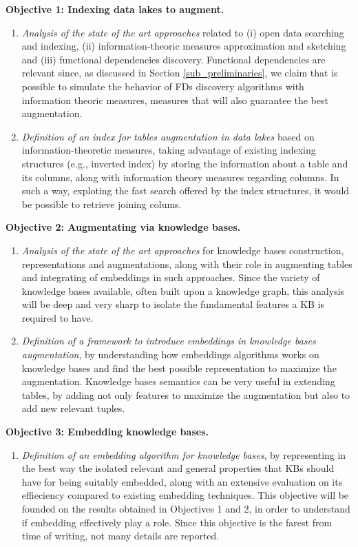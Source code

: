 \bigbreak

\noindent\textbf{Objective 1: Indexing data lakes to augment.}
\begin{enumerate}
    \item \textit{Analysis of the state of the art approaches} related to (i) open data searching and indexing, (ii) information-theoric measures approximation and sketching and (iii) functional dependencies discovery. Functional dependencies are relevant since, as discussed in Section \ref{sub_preliminaries}, we claim that is possible to simulate the behavior of FDs discovery algorithms with information theoric measures, measures that will also guarantee the best augmentation. 
    \item \textit{Definition of an index for tables augmentation in data lakes} based on information-theoretic measures, taking advantage of existing indexing structures (e.g., inverted index) by storing the information about a table and its columns, along with information theory measures regarding columns. In such a way, exploting the fast search offered by the index structures, it would be possible to retrieve joining colums.
\end{enumerate}


\noindent\textbf{Objective 2: Augmentating via knowledge bases.}
\begin{enumerate}
    \item \textit{Analysis of the state of the art approaches} for knowledge bases construction, representations and augmentations, along with their role in augmenting tables and integrating of embeddings in such approaches. Since the variety of knowledge bases available, often built upon a knowledge graph, this analysis will be deep and very sharp to isolate the fundamental features a KB is required to have.
    \item \textit{Definition of a framework to introduce embeddings in knowledge bases augmentation}, by understanding how embeddings algorithms works on knowledge bases and find the best possible representation to maximize the augmentation. Knowledge bases semantics can be very useful in extending tables, by adding not only features to maximize the augmentation but also to add new relevant tuples.
\end{enumerate}

\noindent\textbf{Objective 3: Embedding knowledge bases.}
\begin{enumerate}
    \item \textit{Definition of an embedding algorithm for knowledge bases}, by representing in the best way the isolated relevant and general properties that KBs should have for being suitably embedded, along with an extensive evaluation on its effieciency compared to existing embedding techniques. This objective will be founded on the results obtained in Objectives 1 and 2, in order to understand if embedding effectively play a role. Since this objective is the farest from time of writing, not many details are reported.
\end{enumerate}

